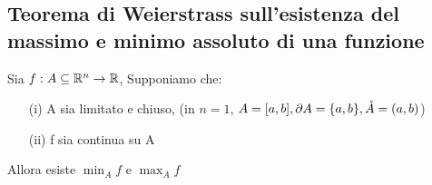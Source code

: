 \subsection{Teorema di Weierstrass sull’esistenza del massimo e minimo assoluto di una funzione}
\begin{theorem}[Weirestrass][BDPG,10.10]
  Sia $f: A \subseteq \mathbb{R}^n \to \mathbb{R}$, Supponiamo che:
  \begin{itemize}
    \item[(i)] A sia limitato e chiuso, (in $n=1$, $A = [a,b], \partial A = \{a,b\}, \mathring{A} = (a,b)$)
    \item[(ii)] f sia continua su A 
  \end{itemize}
  Allora esiste $\min_{A}f$ e $\max_{A}f$
\end{theorem}